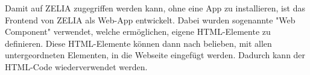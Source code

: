 \label{sec:webcomponents}

Damit auf ZELIA zugegriffen werden kann, ohne eine App zu installieren, ist das Frontend von ZELIA als Web-App entwickelt. Dabei wurden sogenannte "Web Component" verwendet, welche ermöglichen, eigene HTML-Elemente zu definieren. Diese HTML-Elemente können dann nach belieben, mit allen untergeordneten Elementen, in die Webseite eingefügt werden. Dadurch kann der HTML-Code wiederverwendet werden.


\pagebreak
